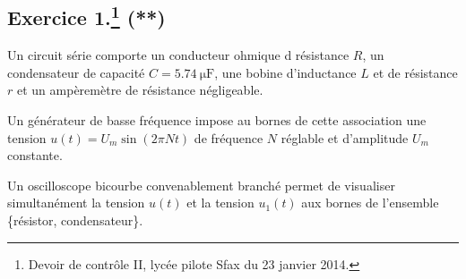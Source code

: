 \documentclass[a4paper]{article}
\begin{document}
\subsection*{Exercice 1.\footnote{Devoir de contrôle II, lycée pilote Sfax du 23 janvier 2014.} (**)}
Un circuit série comporte un conducteur ohmique d résistance $R$, un condensateur de capacité $C=\SI{5,74}{\micro\F}$, une bobine d'inductance $L$ et de résistance $r$ et un ampèremètre de résistance négligeable.

Un générateur de basse fréquence impose au bornes de cette association une tension $u(t)=U_m\sin(2\pi Nt)$ de fréquence $N$ réglable et d'amplitude $U_m$ constante.

Un oscilloscope bicourbe convenablement branché permet de visualiser simultanément la tension $u(t)$ et la tension $u_1(t)$ aux bornes de l'ensemble \{résistor, condensateur\}.
\end{document}
